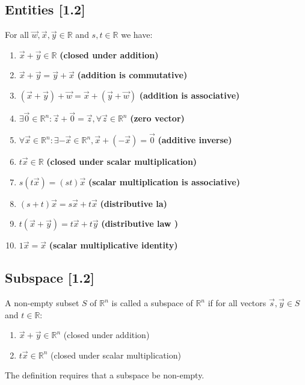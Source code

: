 \documentclass[a4paper,9pt]{extarticle}
\begin{document}
\begin{multicols*}{2}

\subsection{Entities [1.2]}
For all $\vec{w}, \vec{x}, \vec{y} \in \mathbb{R}$ and $s,t \in \mathbb{R}$ we have:
\begin{enumerate}[label=\bfseries (\arabic*)] \itemsep0pt \parskip0pt 
    \item $\vec{x} + \vec{y} \in \mathbb{R}$ \textbf{(closed under addition)}
    \item $\vec{x} + \vec{y} = \vec{y} + \vec{x}$ \textbf{(addition is commutative)}
    \item $(\vec{x} + \vec{y}) + \vec{w} = \vec{x} + (\vec{y} + \vec{w})$ \textbf{(addition is associative)}
    \item $\exists \vec{0} \in \mathbb{R}^n: \vec{z} + \vec{0} = \vec{z}, \forall \vec{z} \in \mathbb{R}^n$ \textbf{(zero vector)}
    \item $\forall \vec{x} \in \mathbb{R}^n: \exists -\vec{x} \in \mathbb{R}^n, \vec{x} + (-\vec{x}) = \vec{0}$ \textbf{(additive inverse)}
    \item $t \vec{x} \in \mathbb{R}$ \textbf{(closed under scalar multiplication)}
    \item $s(t \vec{x}) = (st)\vec{x}$ \textbf{(scalar multiplication is associative)}
    \item $(s + t)\vec{x} = s \vec{x} + t \vec{x}$ \textbf{(distributive la)}
    \item $t(\vec{x} + \vec{y}) = t \vec{x} + t \vec{y}$ \textbf{(distributive law )}
    \item $1 \vec{x} = \vec{x}$ \textbf{(scalar multiplicative identity)}
\end{enumerate}


\subsection{Subspace [1.2]}
A non-empty subset $S$ of $\mathbb{R}^n$ is called a subspace of $\mathbb{R}^n$ if for all vectors $\vec{s},\vec{y} \in S$ and $t \in \mathbb{R}$:
\begin{enumerate}[label=\bfseries (\arabic*)] \itemsep0pt \parskip0pt 
  \item $\vec{x} + \vec{y} \in \mathbb{R}^n$ (closed under addition)
  \item $t \vec{x} \in \mathbb{R}^n$ (closed under scalar multiplication)
\end{enumerate}
The definition requires that a subspace be non-empty.


\end{multicols*}
\end{document}
